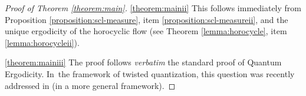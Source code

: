 \begin{proof}[Proof of Theorem \ref{theorem:main}]
\smallskip

\eqref{theorem:mainii}
This follows immediately from Proposition \ref{proposition:scl-measure}, item \eqref{proposition:scl-measureii}, and the unique ergodicity of the horocyclic flow (see Theorem \ref{lemma:horocycle}, item \eqref{lemma:horocycleii}).

\smallskip

\eqref{theorem:mainiii}
The proof follows \emph{verbatim} the standard proof of Quantum Ergodicity. In~the framework of twisted quantization, this question was recently addressed in \cite[\S 5.3]{Cekic-Lefeuvre-24} (in a more general framework).
\end{proof}
